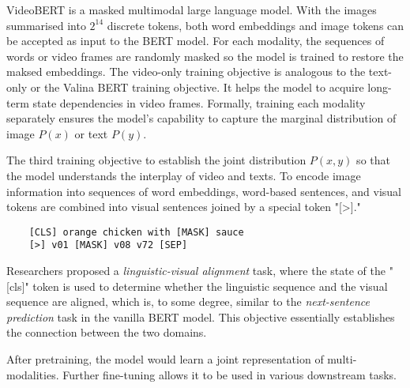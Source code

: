 \documentclass[11pt]{article}
\begin{document}
VideoBERT is a masked multimodal large language model. With the images summarised into $2^14$ discrete tokens, both word embeddings and image tokens can be accepted as input to the BERT model. For each modality, the sequences of words or video frames are randomly masked so the model is trained to restore the maksed embeddings. The video-only training objective is analogous to the text-only or the Valina BERT training objective. It helps the model to acquire long-term state dependencies in video frames. Formally, training each modality separately ensures the model's capability to capture the marginal distribution of image $P(x)$ or text $P(y)$.

The third training objective to establish the joint distribution $P(x,y)$ so that the model understands the interplay of video and texts. To encode image information into sequences of word embeddings, word-based sentences, and visual tokens are combined into visual sentences joined by a special token "[>]."
\begin{verbatim}
    [CLS] orange chicken with [MASK] sauce 
    [>] v01 [MASK] v08 v72 [SEP]
\end{verbatim}
Researchers proposed a \textit{linguistic-visual alignment} task, where the state of the "[cls]" token is used to determine whether the linguistic sequence and the visual sequence are aligned, which is, to some degree, similar to the \textit{next-sentence prediction} task in the vanilla BERT model. This objective essentially establishes the connection between the two domains. 

After pretraining, the model would learn a joint representation of multi-modalities. Further fine-tuning allows it to be used in various downstream tasks.
\end{document}
